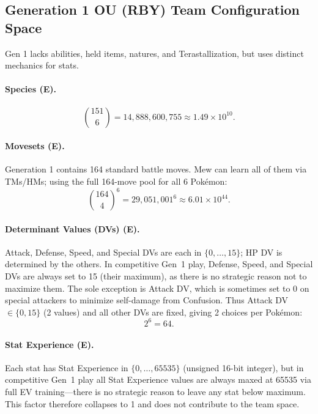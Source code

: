 \subsection{Generation 1 OU (RBY) Team Configuration Space}
\label{sec:gen1-derivation}

Gen 1 lacks abilities, held items, natures, and Terastallization, but uses distinct mechanics for stats.

\paragraph{Species \textbf{(E)}.}
\begin{equation}
    \binom{151}{6} = 14{,}888{,}600{,}755 \approx 1.49 \times 10^{10}.
\end{equation}

\paragraph{Movesets \textbf{(E)}.}
Generation 1 contains 164 standard battle moves.
Mew can learn all of them via TMs/HMs; using the full 164-move pool for all 6 Pokémon:
\begin{equation}
    \binom{164}{4}^6 = 29{,}051{,}001^6 \approx 6.01 \times 10^{44}.
\end{equation}

\paragraph{Determinant Values (DVs) \textbf{(E)}.}
Attack, Defense, Speed, and Special DVs are each in $\{0,\ldots,15\}$; HP DV is determined by the others.
In competitive Gen~1 play, Defense, Speed, and Special DVs are always set to 15 (their maximum), as there is no strategic reason not to maximize them. The sole exception is Attack DV, which is sometimes set to 0 on special attackers to minimize self-damage from Confusion. Thus Attack DV $\in \{0, 15\}$ (2 values) and all other DVs are fixed, giving 2 choices per Pok\'emon:
\begin{equation}
    2^{6} = 64.
\end{equation}

\paragraph{Stat Experience \textbf{(E)}.}
Each stat has Stat Experience in $\{0,\ldots,65535\}$ (unsigned 16-bit integer), but in competitive Gen~1 play all Stat Experience values are always maxed at 65535 via full EV training---there is no strategic reason to leave any stat below maximum. This factor therefore collapses to 1 and does not contribute to the team space.

